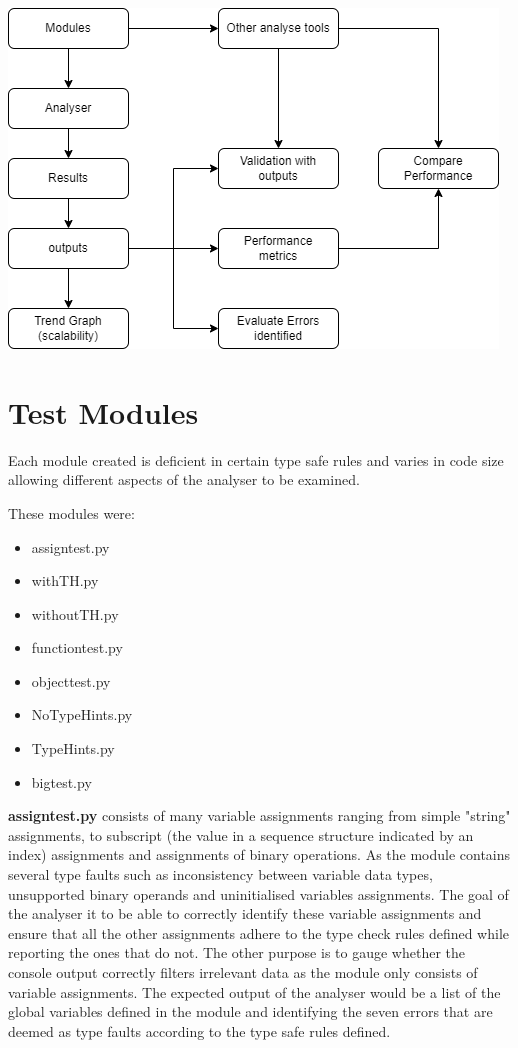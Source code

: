 \documentclass{l4proj}
\begin{document}
\begin{center}
    \includegraphics[width=\textwidth]{images/Evalu_flow.png}
    \label{fig:eva}
\end{center}

\clearpage
\section{Test Modules}
Each module created is deficient in certain type safe rules and varies in code size allowing different aspects of the analyser to be examined. 

These modules were:
\begin{itemize}
    \item assign\textunderscore test.py
    \item withTH.py
    \item withoutTH.py
    \item function\textunderscore test.py
    \item object\textunderscore test.py
    \item NoTypeHints.py
    \item TypeHints.py
    \item big\textunderscore test.py
\end{itemize}

\textbf{assign\textunderscore test.py} consists of many variable assignments ranging from simple "string" assignments, to subscript (the value in a sequence structure indicated by an index) assignments and assignments of binary operations. As the module contains several type faults such as inconsistency between variable data types, unsupported binary operands and uninitialised variables assignments. The goal of the analyser it to be able to correctly identify these variable assignments and ensure that all the other assignments adhere to the type check rules defined while reporting the ones that do not. The other purpose is to gauge whether the console output correctly filters irrelevant data as the module only consists of variable assignments. The expected output of the analyser would be a list of the global variables defined in the module and identifying the seven errors that are deemed as type faults according to the type safe rules defined.
\end{document}
